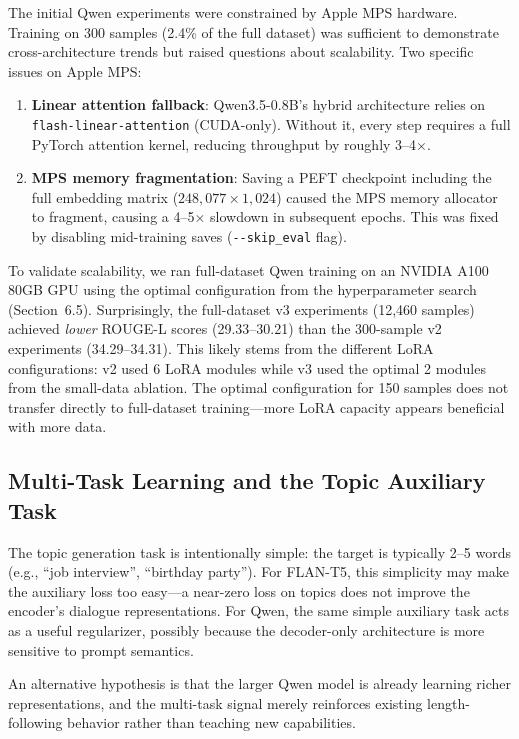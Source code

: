 \documentclass[11pt,a4paper]{article}
\begin{document}
The initial Qwen experiments were constrained by Apple MPS hardware.
Training on 300 samples (2.4\% of the full dataset) was sufficient to demonstrate cross-architecture trends but raised questions about scalability.
Two specific issues on Apple MPS:

\begin{enumerate}[nosep]
  \item \textbf{Linear attention fallback}: Qwen3.5-0.8B's hybrid architecture relies on \texttt{flash-linear-attention} (CUDA-only). Without it, every step requires a full PyTorch attention kernel, reducing throughput by roughly 3--4$\times$.
  \item \textbf{MPS memory fragmentation}: Saving a PEFT checkpoint including the full embedding matrix ($248{,}077 \times 1{,}024$) caused the MPS memory allocator to fragment, causing a 4--5$\times$ slowdown in subsequent epochs. This was fixed by disabling mid-training saves (\texttt{-{}-skip\_eval} flag).
\end{enumerate}

To validate scalability, we ran full-dataset Qwen training on an NVIDIA A100 80GB GPU using the optimal configuration from the hyperparameter search (Section~6.5).
Surprisingly, the full-dataset v3 experiments (12,460 samples) achieved \emph{lower} ROUGE-L scores (29.33--30.21) than the 300-sample v2 experiments (34.29--34.31).
This likely stems from the different LoRA configurations: v2 used 6 LoRA modules while v3 used the optimal 2 modules from the small-data ablation.
The optimal configuration for 150 samples does not transfer directly to full-dataset training---more LoRA capacity appears beneficial with more data.

\subsection{Multi-Task Learning and the Topic Auxiliary Task}

The topic generation task is intentionally simple: the target is typically 2--5 words (e.g., ``job interview'', ``birthday party'').
For FLAN-T5, this simplicity may make the auxiliary loss too easy---a near-zero loss on topics does not improve the encoder's dialogue representations.
For Qwen, the same simple auxiliary task acts as a useful regularizer, possibly because the decoder-only architecture is more sensitive to prompt semantics.

An alternative hypothesis is that the larger Qwen model is already learning richer representations, and the multi-task signal merely reinforces existing length-following behavior rather than teaching new capabilities.
\end{document}
